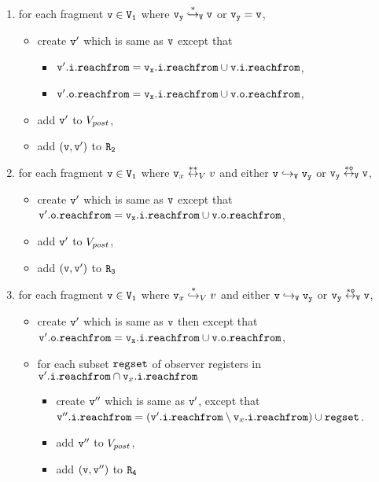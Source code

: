 \begin{itemize}
\begin{enumerate}
\item for each fragment $\tt v \in V_1$ where $\tt \mathtt{v}_y \overset{*}\hookrightarrow_{V} v$ or $\tt \mathtt{v}_y = v$, 
\begin{itemize}
	\item create  $\tt v'$ which is same as $\tt v$ except that
\begin{itemize}
 \item $\tt \mathtt{v}'.\mathtt{i}.\mathtt{reachfrom} = \mathtt{v}_x.\mathtt{i}.\mathtt{reachfrom} \cup \tt \mathtt{v}.\mathtt{i}.\mathtt{reachfrom}$, 
\item $\tt \mathtt{v}'.\mathtt{o}.\mathtt{reachfrom} = \mathtt{v}_x.\mathtt{i}.\mathtt{reachfrom} \cup \tt \mathtt{v}.\mathtt{o}.\mathtt{reachfrom}$, 
\end{itemize}
\item add $\tt v'$ to $V_{post}$,
\item add $\tt (v,v')$ to $\tt R_2$
\end{itemize}
\item for each fragment $\tt v \in V_1$ where $\mathtt{v}_x \overset{**}\leftrightarrow_{V} v$ and either $\tt v \hookrightarrow_{V} \mathtt{v}_y$ or $\tt \mathtt{v}_y \overset{*o}\leftrightarrow_{V} v$, 
\begin{itemize}
\item  create $\tt v'$ which is same as $\tt v$ except that $\tt \mathtt{v}'.\mathtt{o}.\mathtt{reachfrom} = \mathtt{v}_x.\mathtt{i}.\mathtt{reachfrom} \cup \tt \mathtt{v}.\mathtt{o}.\mathtt{reachfrom}$, 
 \item add $\tt v'$ to $V_{post}$, 
 \item add $\tt (v,v')$ to $\tt R_3$

\end{itemize}


\item for each fragment $\tt v \in V_1$ where $\mathtt{v}_x \overset{*}\hookrightarrow_{V} v$ and either $\tt v \hookrightarrow_{V} \mathtt{v}_y$ or $\tt \mathtt{v}_y \overset{*o}\leftrightarrow_{V} v$,  
\begin{itemize}
\item create $\tt v'$ which is same as $\tt v$ then except that $\tt \mathtt{v}'.\mathtt{o}.\mathtt{reachfrom} = \mathtt{v}_x.\mathtt{i}.\mathtt{reachfrom} \cup \tt \mathtt{v}.\mathtt{o}.\mathtt{reachfrom}$, 
\item for each subset $\mathtt{regset}$ of observer registers in $\mathtt{v}'.\mathtt{i}.\mathtt{reachfrom} \cap \mathtt{v}_x.\mathtt{i}.\mathtt{reachfrom}$
\begin{itemize}
\item create $\tt v''$ which is same as $\tt v'$, except that $\mathtt{v}''.\mathtt{i}.\mathtt{reachfrom} = (\mathtt{v}'.\mathtt{i}.\mathtt{reachfrom} \setminus \mathtt{v}_x.\mathtt{i}.\mathtt{reachfrom}) \cup \mathtt{regset}$.
\item add $\tt v''$ to $V_{post}$,
\item add $\tt (v,v'')$ to $\tt R_4$
\end{itemize}
\end{itemize}


\end{enumerate}
\end{itemize}
